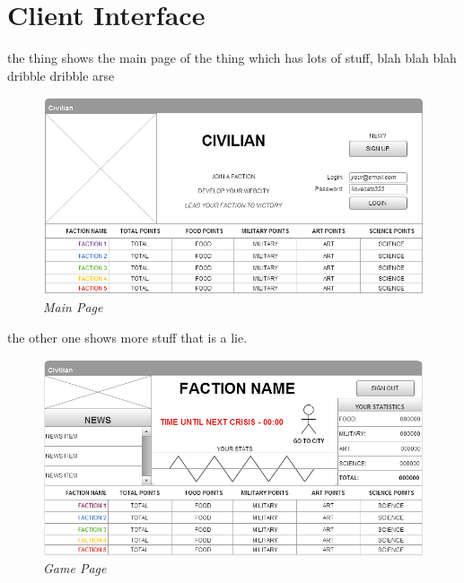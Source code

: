 \documentclass{sig-alt-release2}
\begin{document}
\section{Client Interface}

\verticalspace

the thing shows the main page of the thing which has lots of stuff, blah blah blah dribble dribble arse

\begin{figure}[!htbp]
  \caption{\textit{Main Page}}
  \begin{center}
		\includegraphics[scale=0.25]{img/w3.png}
  \end{center}
\end{figure}

the other one shows more stuff that is a lie.

\begin{figure}[!htbp]
  \caption{\textit{Game Page}}
  \begin{center}
		\includegraphics[scale=0.25]{img/w4.png}
  \end{center}
\end{figure}
\end{document}
